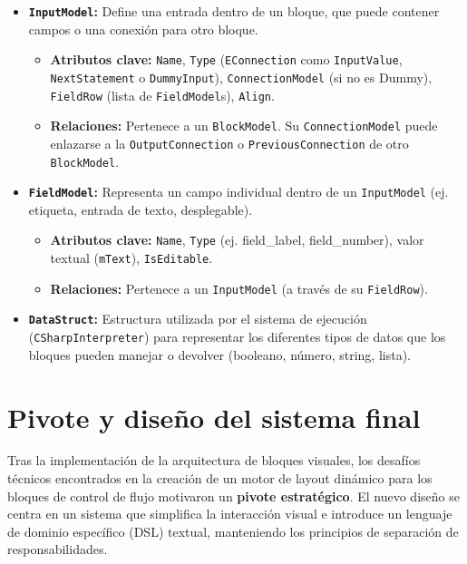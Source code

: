 \begin{itemize}
	\item \textbf{\texttt{InputModel}:} Define una entrada dentro de un bloque, que puede contener campos o una conexión para otro bloque.
	\begin{itemize}
		\item \textbf{Atributos clave:} \texttt{Name}, \texttt{Type} (\texttt{EConnection} como \texttt{InputValue}, \texttt{NextStatement} o \texttt{DummyInput}), \texttt{ConnectionModel} (si no es Dummy), \texttt{FieldRow} (lista de \texttt{FieldModel}s), \texttt{Align}.
		\item \textbf{Relaciones:} Pertenece a un \texttt{BlockModel}. Su \texttt{ConnectionModel} puede enlazarse a la \texttt{OutputConnection} o \texttt{PreviousConnection} de otro \texttt{BlockModel}.
	\end{itemize}
	
	\item \textbf{\texttt{FieldModel}:} Representa un campo individual dentro de un \texttt{InputModel} (ej. etiqueta, entrada de texto, desplegable).
	\begin{itemize}
		\item \textbf{Atributos clave:} \texttt{Name}, \texttt{Type} (ej. field\_label, field\_number), valor textual (\texttt{mText}), \texttt{IsEditable}.
		\item \textbf{Relaciones:} Pertenece a un \texttt{InputModel} (a través de su \texttt{FieldRow}).
	\end{itemize}
	
	\item \textbf{\texttt{DataStruct}:} Estructura utilizada por el sistema de ejecución (\texttt{CSharpInterpreter}) para representar los diferentes tipos de datos que los bloques pueden manejar o devolver (booleano, número, string, lista).
\end{itemize}


\section{Pivote y diseño del sistema final}

Tras la implementación de la arquitectura de bloques visuales, los desafíos técnicos encontrados en la creación de un motor de layout dinámico para los bloques de control de flujo motivaron un \textbf{pivote estratégico}. El nuevo diseño se centra en un sistema  que simplifica la interacción visual e introduce un lenguaje de dominio específico (DSL) textual, manteniendo los principios de separación de responsabilidades.

